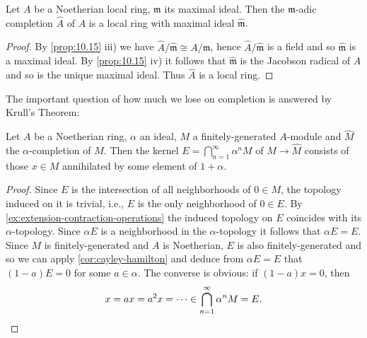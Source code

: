 \begin{proposition}\label{prop:10.16}
    Let $A$ be a Noetherian local ring, $\mathfrak{m}$ its maximal ideal.  
    Then the $\mathfrak{m}$-adic completion $\widehat{A}$ of $A$ is a local ring with maximal ideal $\widehat{\mathfrak{m}}$.
\end{proposition}

\begin{proof}
    By \eqref{prop:10.15} iii) we have $\widehat{A}/\widehat{\mathfrak{m}} \cong A/\mathfrak{m}$, hence $\widehat{A}/\widehat{\mathfrak{m}}$ is a field and so $\widehat{\mathfrak{m}}$ is a maximal ideal. By \eqref{prop:10.15} iv) it follows that $\widehat{\mathfrak{m}}$ is the Jacobson radical of $\widehat{A}$ and so is the unique maximal ideal. Thus $\widehat{A}$ is a local ring. 
\end{proof}

The important question of how much we lose on completion is answered by Krull's Theorem:

\begin{theorem}\label{thm:10.17}
Let $A$ be a Noetherian ring, $\alpha$ an ideal, $M$ a finitely-generated $A$-module and $\widehat{M}$ the $\alpha$-completion of $M$. Then the kernel $E = \bigcap_{n=1}^\infty \alpha^n M$ of $M \to \widehat{M}$ consists of those $x \in M$ annihilated by some element of $1 + \alpha$.
\end{theorem}

\begin{proof}
    Since $E$ is the intersection of all neighborhoods of $0 \in M$, the topology induced on it is trivial, i.e., $E$ is the only neighborhood of $0 \in E$. By \eqref{ex:extension-contraction-operations} the induced topology on $E$ coincides with its $\alpha$-topology. Since $\alpha E$ is a neighborhood in the $\alpha$-topology it follows that $\alpha E = E$. Since $M$ is finitely-generated and $A$ is Noetherian, $E$ is also finitely-generated and so we can apply \eqref{cor:cayley-hamilton} and deduce from $\alpha E = E$ that $(1 - a)E = 0$ for some $a \in \alpha$. The converse is obvious: if $(1 - a)x = 0$, then  
    \[
    x = a x = a^2 x = \cdots \in \bigcap_{n=1}^\infty \alpha^n M = E. \qedhere
    \]  
\end{proof}

